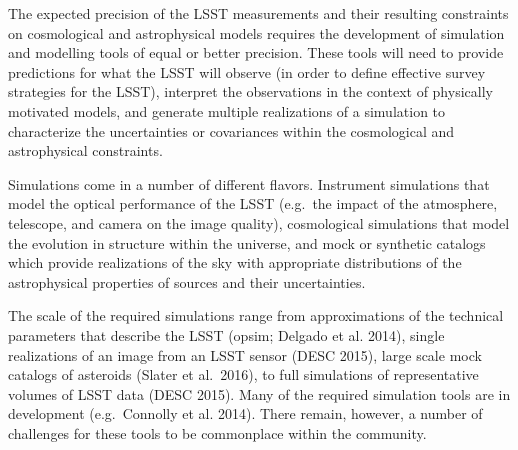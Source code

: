 \documentclass{iau}
\begin{document}
The expected precision of the LSST measurements and their resulting
constraints on cosmological and astrophysical models requires the
development of simulation and modelling tools of equal or better
precision. These tools will need to provide predictions for what the LSST
will observe (in order to define effective survey strategies for the
LSST),  interpret the observations in the context of physically
motivated models, and generate multiple realizations of a simulation
to characterize the uncertainties or covariances within the
cosmological and astrophysical constraints.

Simulations come in a number of different flavors. Instrument
simulations that model the optical performance of the LSST (e.g.\ the
impact of the atmosphere, telescope, and camera on the image quality),
cosmological simulations that model the evolution in structure within
the universe, and mock or synthetic catalogs which provide
realizations of the sky with appropriate distributions of the
astrophysical properties of sources and their uncertainties.

The scale of the required simulations range from approximations of the
technical parameters that describe the LSST (opsim; Delgado et
al. 2014), single realizations of an image from an LSST sensor (DESC 2015), large scale mock catalogs of asteroids (Slater et al.\
2016), to full simulations of representative volumes of LSST data
(DESC 2015). Many of the required simulation tools are in
development (e.g.\ Connolly et al. 2014). There remain, however, a
number of challenges for these tools to be commonplace within the
community.
\end{document}
